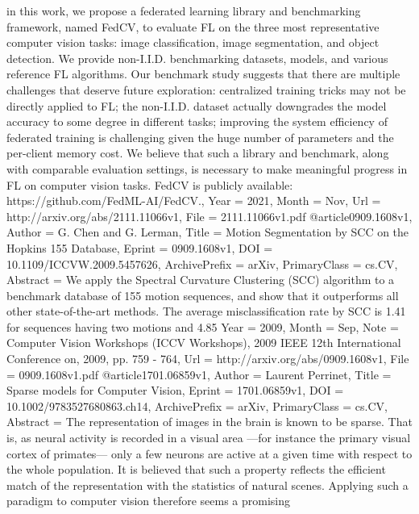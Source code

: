 {{{in this work, we propose a federated learning library and benchmarking
framework, named FedCV, to evaluate FL on the three most representative
computer vision tasks: image classification, image segmentation, and object
detection. We provide non-I.I.D. benchmarking datasets, models, and various
reference FL algorithms. Our benchmark study suggests that there are multiple
challenges that deserve future exploration: centralized training tricks may not
be directly applied to FL; the non-I.I.D. dataset actually downgrades the model
accuracy to some degree in different tasks; improving the system efficiency of
federated training is challenging given the huge number of parameters and the
per-client memory cost. We believe that such a library and benchmark, along
with comparable evaluation settings, is necessary to make meaningful progress
in FL on computer vision tasks. FedCV is publicly available:
https://github.com/FedML-AI/FedCV.},
Year          = {2021},
Month         = {Nov},
Url           = {http://arxiv.org/abs/2111.11066v1},
File          = {2111.11066v1.pdf}
}
@article{0909.1608v1,
Author        = {G. Chen and G. Lerman},
Title         = {Motion Segmentation by SCC on the Hopkins 155 Database},
Eprint        = {0909.1608v1},
DOI           = {10.1109/ICCVW.2009.5457626},
ArchivePrefix = {arXiv},
PrimaryClass  = {cs.CV},
Abstract      = {We apply the Spectral Curvature Clustering (SCC) algorithm to a benchmark
database of 155 motion sequences, and show that it outperforms all other
state-of-the-art methods. The average misclassification rate by SCC is 1.41%
for sequences having two motions and 4.85%
Year          = {2009},
Month         = {Sep},
Note          = {Computer Vision Workshops (ICCV Workshops), 2009 IEEE 12th
  International Conference on, 2009, pp. 759 - 764},
Url           = {http://arxiv.org/abs/0909.1608v1},
File          = {0909.1608v1.pdf}
}
@article{1701.06859v1,
Author        = {Laurent Perrinet},
Title         = {Sparse models for Computer Vision},
Eprint        = {1701.06859v1},
DOI           = {10.1002/9783527680863.ch14},
ArchivePrefix = {arXiv},
PrimaryClass  = {cs.CV},
Abstract      = {The representation of images in the brain is known to be sparse. That is, as
neural activity is recorded in a visual area ---for instance the primary visual
cortex of primates--- only a few neurons are active at a given time with
respect to the whole population. It is believed that such a property reflects
the efficient match of the representation with the statistics of natural
scenes. Applying such a paradigm to computer vision therefore seems a promising
}}}}
